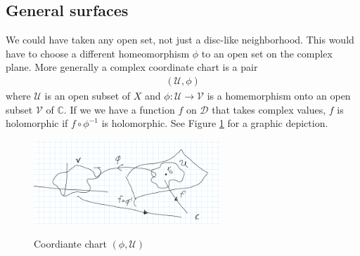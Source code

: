 \documentclass[lettersize,11pt]{article}
\begin{document}
\subsection{General surfaces}
We could have taken any open set, not just a disc-like neighborhood. This would have to choose a different homeomorphism $\phi$ to an open set on the complex plane. More generally a complex coordinate chart is a pair
\begin{equation}
	\begin{aligned}
		(\mathcal{U},\phi)
	\end{aligned}
\end{equation}
where $\mathcal{U}$ is an open subset of $X$ and $\phi:\mathcal{U}\to \mathcal{V}$ is a homemorphism onto an open subset $\mathcal{V}$ of $\mathds{C}$. If we we have a function $f$ on $\mathcal{D}$ that takes complex values, $f$ is holomorphic if $f\circ \phi^{-1}$ is holomorphic. See Figure \ref{fig:charts} for a graphic depiction.

\begin{figure}[H]\centering
\includegraphics[width=7cm]{4} \label{fig:charts} \caption{Coordiante chart $(\phi, \mathcal{U})$}
\end{figure}
\end{document}
